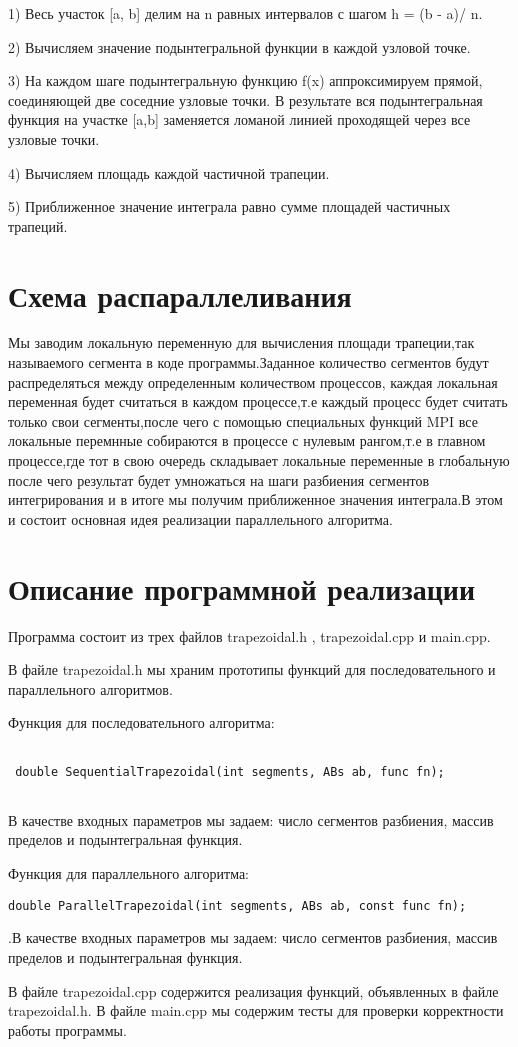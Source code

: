 \documentclass{report}
\begin{document}
\par1) Весь участок [a, b] делим на n равных интервалов с шагом h = (b - a)/ n.
\par2) Вычисляем значение подынтегральной функции в каждой узловой точке.
\par3) На каждом шаге подынтегральную функцию f(x) аппроксимируем прямой, соединяющей две соседние узловые точки. В результате вся подынтегральная функция на участке [a,b] заменяется ломаной линией проходящей через все узловые точки.
\par4) Вычисляем площадь каждой частичной трапеции.
\par5) Приближенное значение интеграла равно сумме площадей частичных трапеций.

\newpage

\section*{Схема распараллеливания}
\par
 Мы заводим локальную переменную для вычисления площади трапеции,так называемого сегмента в коде программы.Заданное количество сегментов будут распределяться между определенным количеством процессов, каждая локальная переменная будет считаться в каждом процессе,т.е каждый процесс будет считать только свои сегменты,после чего с помощью специальных функций MPI все локальные перемнные собираются в процессе с нулевым рангом,т.е в главном процессе,где тот в свою очередь складывает локальные переменные в глобальную после чего результат будет умножаться на шаги разбиения сегментов интегрирования и в итоге мы получим приближенное значения интеграла.В этом и состоит основная идея реализации параллельного алгоритма.

\newpage

\section*{Описание программной реализации}
Программа состоит из трех файлов trapezoidal.h , trapezoidal.cpp и main.cpp.
\par В файле trapezoidal.h мы храним прототипы функций для последовательного и параллельного алгоритмов.
\par Функция для последовательного алгоритма:
\begin{lstlisting}

 double SequentialTrapezoidal(int segments, ABs ab, func fn);
  
\end{lstlisting}
В качестве входных  параметров мы задаем: число сегментов разбиения, массив пределов  и подынтегральная функция.
\par Функция для параллельного
алгоритма:
\begin{lstlisting}
double ParallelTrapezoidal(int segments, ABs ab, const func fn);
\end{lstlisting}
.В качестве входных  параметров мы задаем: число сегментов разбиения, массив пределов  и подынтегральная функция.
\par В файле  trapezoidal.cpp содержится реализация функций, объявленных в файле trapezoidal.h. В файле  main.cpp мы содержим тесты для проверки корректности работы программы.
\newpage
\end{document}
